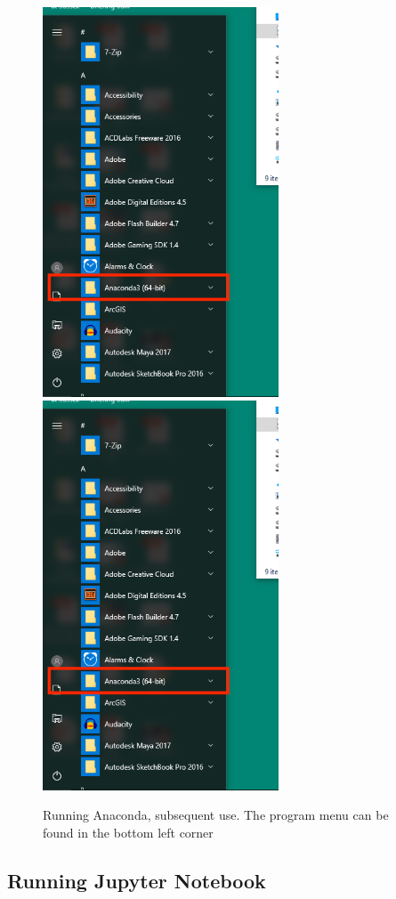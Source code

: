 \begin{figure}[htbp]  
\centering
\includegraphics[width=7cm]{Figures/Capture2.PNG}
\includegraphics[width=7cm]{Figures/Capture2.PNG}
\caption{Running Anaconda, subsequent use.
  The program menu can be found in the bottom left corner}
\label{fig:programmen}
\end{figure}

\subsection{Running Jupyter Notebook}


